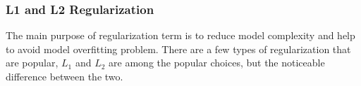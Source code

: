 \subsubsection{L1 and L2 Regularization}

The main purpose of regularization term is to reduce model complexity and help to avoid model overfitting problem. There are a few types of regularization that are popular, $L_1$ and $L_2$ are among the popular choices, but the noticeable difference between the two. 